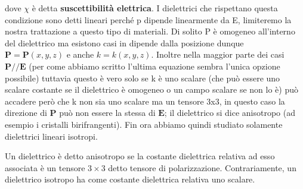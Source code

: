 \documentclass[
10pt, %
a4paper, %
oneside, %
headinclude,footinclude, %
BCOR5mm, %
]{scrartcl}
\begin{document}
dove $\chi$ è detta \textbf{suscettibilità elettrica}. I dielettrici che rispettano questa condizione sono detti lineari perché p dipende linearmente da E, limiteremo la nostra trattazione a questo tipo di materiali. Di solito P è omogeneo all'interno del dielettrico ma esistono casi in dipende dalla posizione dunque \(\mathbf{P} = \mathbf{P}(x, y, z)\) e anche \(k = k(x, y, z)\). Inoltre nella maggior parte dei casi \(\mathbf{P} // \mathbf{E}\) (per come abbiamo scritto l'ultima equazione sembra l'unica opzione possibile) tuttavia questo è vero solo se k è uno scalare (che può essere uno scalare costante se il dielettrico è omogeneo o un campo scalare se non lo è) può accadere però che k non sia uno scalare ma un tensore 3x3, in questo caso la direzione di $\mathbf{P}$ può non essere la stessa di $\mathbf{E}$; il dielettrico si dice anisotropo (ad esempio i cristalli birifrangenti). Fin ora abbiamo quindi studiato solamente dielettrici lineari isotropi.
\begin{definizione}
	Un dielettrico è detto anisotropo se la costante dielettrica relativa ad esso associata è un tensore \(3\times 3\) detto tensore di polarizzazione. Contrariamente, un dielettrico isotropo ha come costante dielettrica relativa uno scalare.
\end{definizione}
\end{document}
